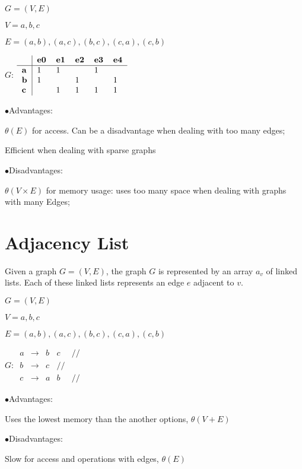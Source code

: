 \documentclass[10pt,a4paper]{article}
\begin{document}
$G=(V,E)$

$V = {a,b,c}$

$E = {(a,b), (a,c), (b,c), (c,a), (c,b)}$

$G$:
$
\begin{tabular}{l|lllll}
           & \textbf{e0} & \textbf{e1} & \textbf{e2} & \textbf{e3} & \textbf{e4} \\ \hline
\textbf{a} & 1           & 1           &             & 1           &             \\
\textbf{b} & 1           &             & 1           &             & 1           \\
\textbf{c} &             & 1           & 1           & 1           & 1          
\end{tabular}
$

\begin{list}{$ \bullet $}{Advantages:}
\item $\theta (E) $ for access. Can be a disadvantage when dealing with too many edges;
\item Efficient when dealing with sparse graphs
\end{list}
\begin{list}{$ \bullet $}{Disadvantages:}
\item $\theta (V \times E) $ for memory usage: uses too many space when dealing with graphs with many Edges;
\end{list}


\section{Adjacency List}
Given a graph $G=(V,E)$, the graph $G$ is represented by an array $a_{v}$ of linked lists.
Each of these linked lists represents an edge $e$ adjacent to $v$.

$G=(V,E)$

$V = {a,b,c}$

$E = {(a,b), (a,c), (b,c), (c,a), (c,b)}$

$G$:
$
\begin{array}{ccccc}
a & \rightarrow & b & c & // \\ 
b & \rightarrow  & c & // &  \\ 
c & \rightarrow  & a & b & //
\end{array}
$

\begin{list}{$ \bullet $}{Advantages:}
\item Uses the lowest memory than the another options, $ \theta (V + E) $
\end{list}
\begin{list}{$ \bullet $}{Disadvantages:}
\item Slow for access and operations with edges, $\theta (E) $
\end{list}
\end{document}

